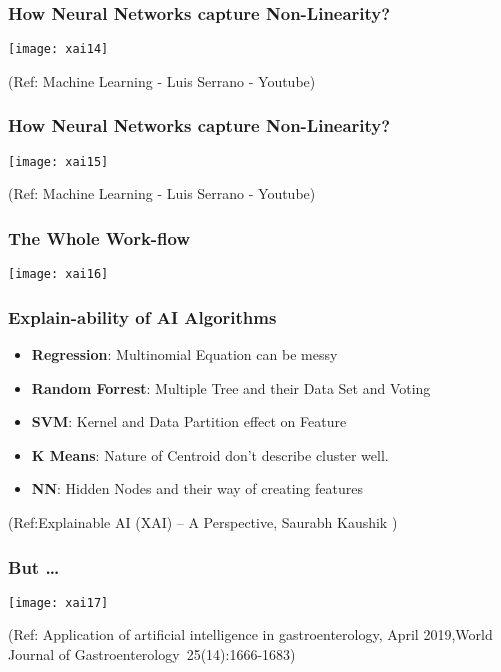 \begin{frame}[fragile]\frametitle{How Neural Networks capture Non-Linearity?}
\begin{center}
\texttt{[image: xai14]}
\end{center}

\tiny{(Ref: Machine Learning - Luis Serrano - Youtube)}
\end{frame}

\begin{frame}[fragile]\frametitle{How Neural Networks capture Non-Linearity?}
\begin{center}
\texttt{[image: xai15]}
\end{center}

\tiny{(Ref: Machine Learning - Luis Serrano - Youtube)}
\end{frame}

\begin{frame}[fragile]\frametitle{The Whole Work-flow}
\begin{center}
\texttt{[image: xai16]}
\end{center}

\end{frame}

\begin{frame}[fragile]\frametitle{Explain-ability of AI Algorithms}
\begin{itemize}
\item {\bf Regression}: Multinomial Equation can be messy 
\item {\bf Random Forrest}: Multiple Tree and their Data Set and Voting 
\item {\bf SVM}: Kernel and Data Partition effect on Feature 
\item {\bf K Means}: Nature of Centroid don't describe cluster well. 
\item {\bf NN}: Hidden Nodes and their way of creating features 
\end{itemize}

\tiny{(Ref:Explainable AI (XAI) – A Perspective, Saurabh Kaushik  )}

\end{frame}

\begin{frame}[fragile]\frametitle{But \ldots}
\begin{center}
\texttt{[image: xai17]}
\end{center}

\tiny{(Ref: Application of artificial intelligence in gastroenterology, April 2019,World Journal of Gastroenterology 25(14):1666-1683)
}
\end{frame}

